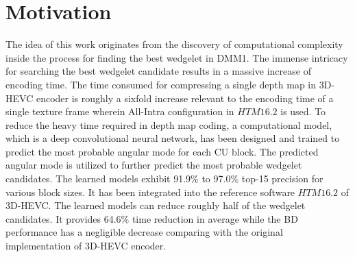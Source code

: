 \section{Motivation}\label{sec:motivation_and_contribution}
The idea of this work originates from the discovery of computational
complexity inside the process for finding the best wedgelet in DMM1.
The immense intricacy for searching the best wedgelet candidate results in
a massive increase of encoding time.
The time consumed for compressing a single depth map in 3D-HEVC encoder is
roughly a sixfold increase relevant to the encoding time of a single texture
frame wherein All-Intra configuration in \(HTM16.2\) is used.
To reduce the heavy time required in depth map coding, 
a computational model, which is a deep convolutional neural network,
has been designed and trained to predict the most probable angular mode
for each CU block.
The predicted angular mode is utilized to further predict the 
most probable wedgelet candidates.
The learned models exhibit 91.9\% to 97.0\% top-15 precision for various
block sizes.
It has been integrated into the reference software
\(HTM16.2\) of 3D-HEVC\@.
The learned models can reduce roughly half of the wedgelet candidates.
It provides 64.6\% time reduction in average while the BD performance
has a negligible decrease comparing with the original
implementation of 3D-HEVC encoder.

